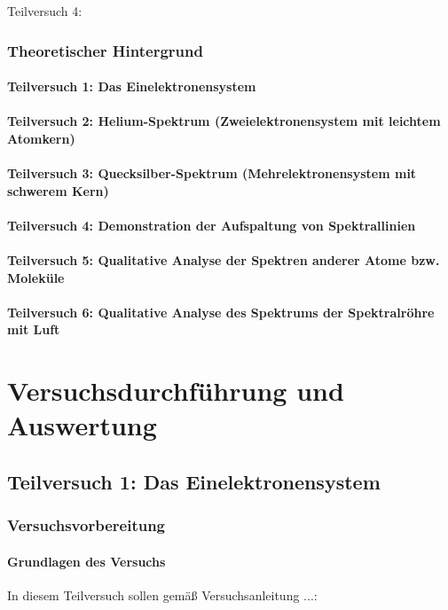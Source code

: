 \documentclass[12pt,oneside,oldfontcommands]{memoir}
\begin{document}
Teilversuch 4:\\


\subsubsection{Theoretischer Hintergrund}
\paragraph{Teilversuch 1: Das Einelektronensystem}
\paragraph{Teilversuch 2: Helium-Spektrum (Zweielektronensystem mit leichtem Atomkern)}
\paragraph{Teilversuch 3: Quecksilber-Spektrum (Mehrelektronensystem mit schwerem
Kern)}
\paragraph{Teilversuch 4: Demonstration der Aufspaltung von Spektrallinien}
\paragraph{Teilversuch 5: Qualitative Analyse der Spektren anderer Atome bzw.
Moleküle}
\paragraph{Teilversuch 6: Qualitative Analyse des Spektrums der Spektralröhre mit Luft
}

\section{Versuchsdurchführung und Auswertung}
\subsection{Teilversuch 1: Das Einelektronensystem}
\subsubsection{Versuchsvorbereitung}
\paragraph{Grundlagen des Versuchs}
In diesem Teilversuch sollen gemäß Versuchsanleitung ...:
\end{document}
